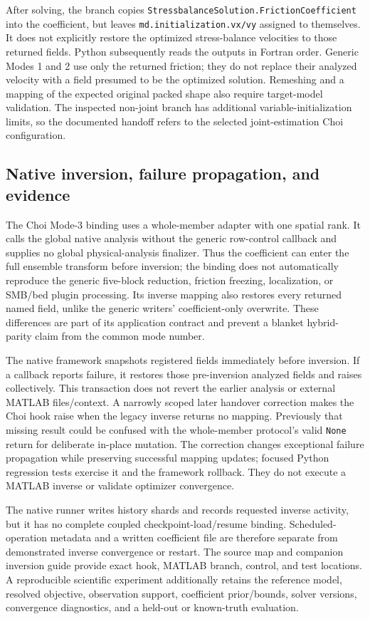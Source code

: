 \documentclass[11pt,a4paper]{article}
\newcommand{\code}[1]{\nolinkurl{#1}}
\begin{document}
After solving, the branch copies \code{StressbalanceSolution.FrictionCoefficient} into the coefficient, but leaves \code{md.initialization.vx/vy} assigned to themselves. It does not explicitly restore the optimized stress-balance velocities to those returned fields. Python subsequently reads the outputs in Fortran order. Generic Modes 1 and 2 use only the returned friction; they do not replace their analyzed velocity with a field presumed to be the optimized solution. Remeshing and a mapping of the expected original packed shape also require target-model validation. The inspected non-joint branch has additional variable-initialization limits, so the documented handoff refers to the selected joint-estimation Choi configuration.

\subsection{Native inversion, failure propagation, and evidence}
The Choi Mode-3 binding uses a whole-member adapter with one spatial rank. It calls the global native analysis without the generic row-control callback and supplies no global physical-analysis finalizer. Thus the coefficient can enter the full ensemble transform before inversion; the binding does not automatically reproduce the generic five-block reduction, friction freezing, localization, or SMB/bed plugin processing. Its inverse mapping also restores every returned named field, unlike the generic writers' coefficient-only overwrite. These differences are part of its application contract and prevent a blanket hybrid-parity claim from the common mode number.

The native framework snapshots registered fields immediately before inversion. If a callback reports failure, it restores those pre-inversion analyzed fields and raises collectively. This transaction does not revert the earlier analysis or external MATLAB files/context. A narrowly scoped later handover correction makes the Choi hook raise when the legacy inverse returns no mapping. Previously that missing result could be confused with the whole-member protocol's valid \code{None} return for deliberate in-place mutation. The correction changes exceptional failure propagation while preserving successful mapping updates; focused Python regression tests exercise it and the framework rollback. They do not execute a MATLAB inverse or validate optimizer convergence.

The native runner writes history shards and records requested inverse activity, but it has no complete coupled checkpoint-load/resume binding. Scheduled-operation metadata and a written coefficient file are therefore separate from demonstrated inverse convergence or restart. The source map and companion inversion guide provide exact hook, MATLAB branch, control, and test locations. A reproducible scientific experiment additionally retains the reference model, resolved objective, observation support, coefficient prior/bounds, solver versions, convergence diagnostics, and a held-out or known-truth evaluation.
\end{document}
